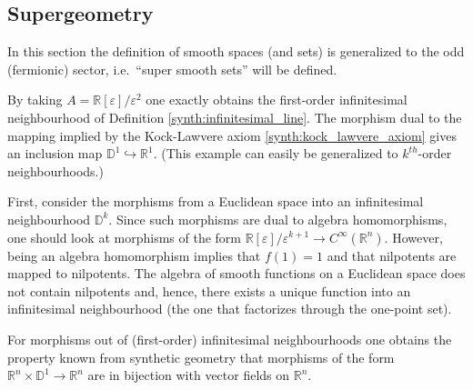 \subsection{Supergeometry}

    In this section the definition of smooth spaces (and sets) is generalized to the odd (fermionic) sector, i.e.~``super smooth sets'' will be defined.
    \begin{example}
        By taking $A=\mathbb{R}[\varepsilon]/\varepsilon^2$ one exactly obtains the first-order infinitesimal neighbourhood of Definition \ref{synth:infinitesimal_line}. The morphism dual to the mapping implied by the Kock-Lawvere axiom \ref{synth:kock_lawvere_axiom} gives an inclusion map $\mathbb{D}^1\hookrightarrow\mathbb{R}^1$. (This example can easily be generalized to $k^{th}$-order neighbourhoods.)
    \end{example}

    \begin{property}[Morphisms]
        First, consider the morphisms from a Euclidean space into an infinitesimal neighbourhood $\mathbb{D}^k$. Since such morphisms are dual to algebra homomorphisms, one should look at morphisms of the form $\mathbb{R}[\varepsilon]/\varepsilon^{k+1}\rightarrow C^\infty(\mathbb{R}^n)$. However, being an algebra homomorphism implies that $f(1)=1$ and that nilpotents are mapped to nilpotents. The algebra of smooth functions on a Euclidean space does not contain nilpotents and, hence, there exists a unique function into an infinitesimal neighbourhood (the one that factorizes through the one-point set).

        For morphisms out of (first-order) infinitesimal neighbourhoods one obtains the property known from synthetic geometry that morphisms of the form $\mathbb{R}^n\times\mathbb{D}^1\rightarrow\mathbb{R}^n$ are in bijection with vector fields on $\mathbb{R}^n$.
    \end{property}

